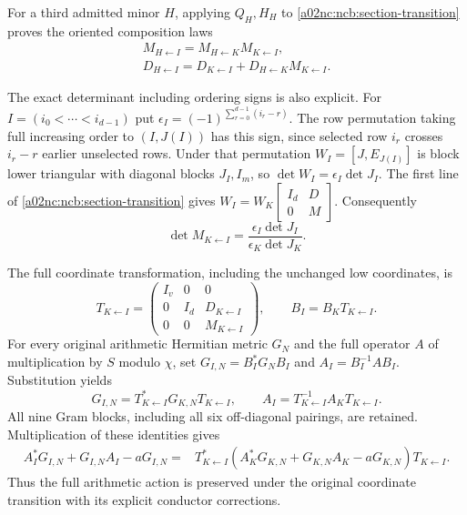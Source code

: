 \documentclass[11pt,a4paper]{article}
\begin{document}
For a third admitted minor $H$, applying $Q_H,H_H$ to
\eqref{a02nc:ncb:section-transition} proves the oriented composition laws
\begin{equation}\tag{NCB19}\label{a02nc:ncb:cocycle}
\begin{gathered}
M_{H\leftarrow I}=M_{H\leftarrow K}M_{K\leftarrow I},\\
D_{H\leftarrow I}
 =D_{K\leftarrow I}+D_{H\leftarrow K}M_{K\leftarrow I}.
\end{gathered}
\end{equation}

The exact determinant including ordering signs is also explicit.
For $I=(i_0<\cdots<i_{d-1})$ put
$\epsilon_I=(-1)^{\sum_{r=0}^{d-1}(i_r-r)}$.
The row permutation taking full increasing order to $(I,J(I))$
has this sign, since selected row $i_r$ crosses $i_r-r$ earlier
unselected rows. Under that permutation $W_I=[J,E_{J(I)}]$ is
block lower triangular with diagonal blocks $J_I,I_m$, so
$\det W_I=\epsilon_I\det J_I$. The first line of
\eqref{a02nc:ncb:section-transition} gives
$W_I=W_K\left[\begin{smallmatrix}I_d&D\\0&M\end{smallmatrix}\right]$.
Consequently
\begin{equation}\tag{NCB20}\label{a02nc:ncb:dettransition}
\det M_{K\leftarrow I}
 =\frac{\epsilon_I\det J_I}{\epsilon_K\det J_K}.
\end{equation}

The full coordinate transformation, including the unchanged low
coordinates, is
\begin{equation}\tag{NCB21}\label{a02nc:ncb:full-transition}
T_{K\leftarrow I}=
\begin{pmatrix}I_v&0&0\\0&I_d&D_{K\leftarrow I}\\
0&0&M_{K\leftarrow I}\end{pmatrix},
\qquad B_I=B_KT_{K\leftarrow I}.
\end{equation}
For every original arithmetic Hermitian metric $G_N$ and the full
operator $A$ of multiplication by $S$ modulo $\chi$, set
$G_{I,N}=B_I^*G_NB_I$ and $A_I=B_I^{-1}AB_I$. Substitution yields
\begin{equation}\tag{NCB22}\label{a02nc:ncb:gram-action}
G_{I,N}=T_{K\leftarrow I}^*G_{K,N}T_{K\leftarrow I},\qquad
A_I=T_{K\leftarrow I}^{-1}A_KT_{K\leftarrow I}.
\end{equation}
All nine Gram blocks, including all six off-diagonal pairings, are
retained. Multiplication of these identities gives
\begin{equation}\tag{NCB23}\label{a02nc:ncb:centered-action}
\begin{split}
A_I^*G_{I,N}+G_{I,N}A_I-aG_{I,N}
={}&T_{K\leftarrow I}^*
(A_K^*G_{K,N}+G_{K,N}A_K-aG_{K,N})T_{K\leftarrow I}.
\end{split}
\end{equation}
Thus the full arithmetic action is preserved under the original
coordinate transition with its explicit conductor corrections.
\end{document}

